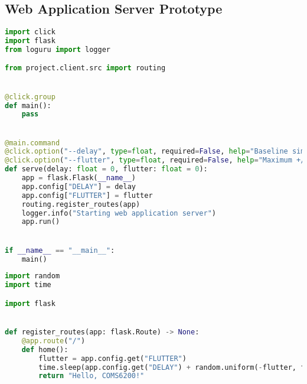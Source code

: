\begin{appendices}


\section{Web Application Server Prototype} \label{app:web_server}
\begin{lstlisting}[language=python,caption={main.py},captionpos=b]
import click
import flask
from loguru import logger

from project.client.src import routing


@click.group
def main():
    pass


@main.command
@click.option("--delay", type=float, required=False, help="Baseline simulated processing delay")
@click.option("--flutter", type=float, required=False, help="Maximum +/- variation in processing delay")
def serve(delay: float = 0, flutter: float = 0):
    app = flask.Flask(__name__)
    app.config["DELAY"] = delay
    app.config["FLUTTER"] = flutter
    routing.register_routes(app)
    logger.info("Starting web application server")
    app.run()


if __name__ == "__main__":
    main()

\end{lstlisting}

\begin{lstlisting}[language=python,caption={routing.py},captionpos=b]
import random
import time

import flask


def register_routes(app: flask.Route) -> None:
    @app.route("/")
    def home():
        flutter = app.config.get("FLUTTER")
        time.sleep(app.config.get("DELAY") + random.uniform(-flutter, flutter)
        return "Hello, COMS6200!"

\end{lstlisting}





\end{appendices}